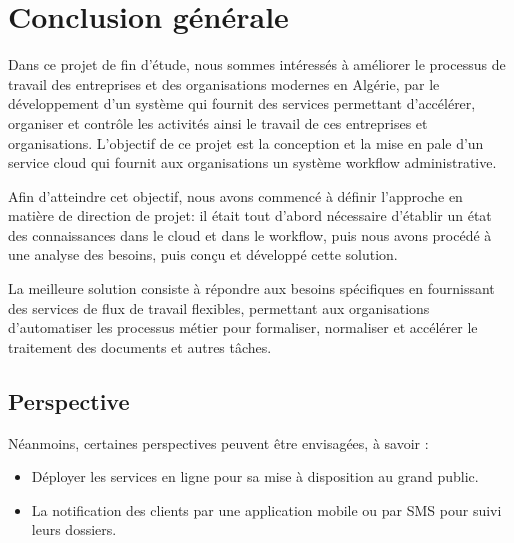 \chapter*{Conclusion générale }
\large
Dans ce projet de fin d’étude, nous sommes intéressés à améliorer le processus de travail des entreprises et des organisations modernes en Algérie, par le développement d'un système qui fournit des services permettant d’accélérer, organiser et contrôle les activités ainsi  le travail de ces entreprises et organisations.
L'objectif de ce projet est la conception et la mise en pale d'un service cloud qui fournit aux organisations un système workflow administrative. 

Afin d’atteindre cet objectif, nous avons commencé à définir l’approche en matière de direction de projet: il était tout d’abord nécessaire d’établir un état des connaissances dans le cloud et dans le workflow, puis nous avons procédé à une analyse des besoins, puis conçu et développé cette solution.
 
 
La meilleure solution consiste à répondre aux besoins spécifiques en fournissant des services de flux de travail flexibles, permettant aux organisations d'automatiser les processus métier pour formaliser, normaliser et accélérer le traitement des documents et autres tâches.

\section*{Perspective}
Néanmoins, certaines perspectives peuvent être envisagées, à savoir : 

 \begin{itemize}
        \item  Déployer les services en ligne pour sa mise à disposition au grand public.
        \item   La notification des clients par une application mobile ou par SMS pour suivi leurs dossiers.
 \end{itemize}

\normalsize